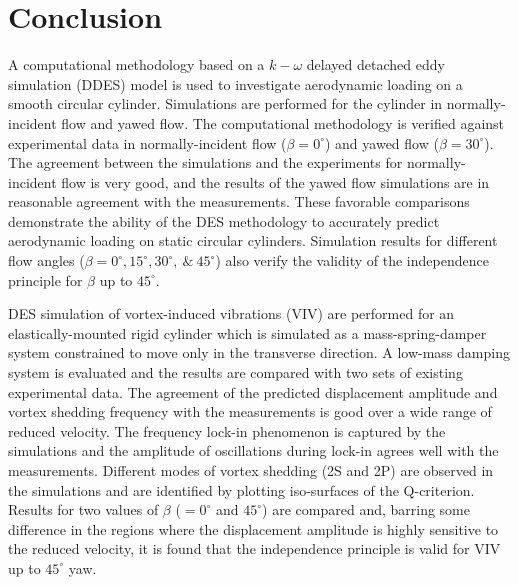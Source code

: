 \documentclass[12pt,authoryear]{elsarticle}
\begin{document}




%



\section{Conclusion}
\label{sec:conclusions}
%
A computational methodology based on a $k-\omega$ delayed detached eddy
simulation (DDES) model is used to investigate aerodynamic loading on a smooth
circular cylinder. Simulations are performed for the cylinder in
normally-incident flow and yawed flow. The computational methodology is
verified against experimental data in normally-incident flow ($\beta=0^\circ$)
and yawed flow ($\beta=30^\circ$). The agreement between the simulations and
the experiments for normally-incident flow is very good, and the results of the
yawed flow simulations are in reasonable agreement with the measurements.
These favorable comparisons demonstrate the ability of the DES methodology to
accurately predict aerodynamic loading on static circular cylinders. Simulation
results for different flow angles ($\beta =0^\circ, 15^\circ,
30^\circ,~\&~45^\circ$) also verify the validity of the independence principle
for $\beta$ up to $45^\circ$.

DES simulation of vortex-induced vibrations (VIV) are performed for an
elastically-mounted rigid cylinder which is simulated as a mass-spring-damper
system constrained to move only in the transverse direction. A low-mass damping
system is evaluated and the results are compared with two sets of existing
experimental data. The agreement of the predicted displacement amplitude and
vortex shedding frequency with the measurements is good over a wide range of
reduced velocity. The frequency lock-in phenomenon is captured by the
simulations and the amplitude of oscillations during lock-in agrees well with
the measurements. Different modes of vortex shedding (2S and 2P) are observed
in the simulations and are identified by plotting iso-surfaces of the
Q-criterion.  Results for two values of $\beta$ ($=0^\circ$ and $45^\circ$) are
compared and, barring some difference in the regions where the displacement
amplitude is highly sensitive to the reduced velocity, it is found that the
independence principle is valid for VIV up to $45^\circ$ yaw. 
\end{document}
